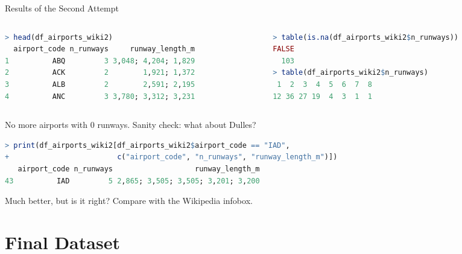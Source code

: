\documentclass[9pt,aspectratio=169]{beamer}
\begin{document}
\begin{frame}[fragile]{Results of the Second Attempt}

\begin{columns}[t]
  \begin{column}{0.5\textwidth}
\begin{lstlisting}[language=R, basicstyle=\ttfamily\scriptsize]
> head(df_airports_wiki2)
  airport_code n_runways     runway_length_m
1          ABQ         3 3,048; 4,204; 1,829
2          ACK         2        1,921; 1,372
3          ALB         2        2,591; 2,195
4          ANC         3 3,780; 3,312; 3,231
\end{lstlisting}
  \end{column}
  \begin{column}{0.45\textwidth}
\begin{lstlisting}[language=R, basicstyle=\ttfamily\scriptsize]
> table(is.na(df_airports_wiki2$n_runways))
FALSE
  103
> table(df_airports_wiki2$n_runways)
 1  2  3  4  5  6  7  8
12 36 27 19  4  3  1  1
\end{lstlisting}
  \end{column}
\end{columns}

\pause
No more airports with 0 runways. Sanity check: what about Dulles?
\begin{lstlisting}[language=R, basicstyle=\ttfamily\scriptsize]
> print(df_airports_wiki2[df_airports_wiki2$airport_code == "IAD",
+                         c("airport_code", "n_runways", "runway_length_m")])
   airport_code n_runways                   runway_length_m
43          IAD         5 2,865; 3,505; 3,505; 3,201; 3,200
\end{lstlisting}
\pause
\begin{center}
\alert{Much better, but is it right? Compare with the Wikipedia infobox.}
\end{center}
\end{frame}


\section{Final Dataset}
\end{document}
